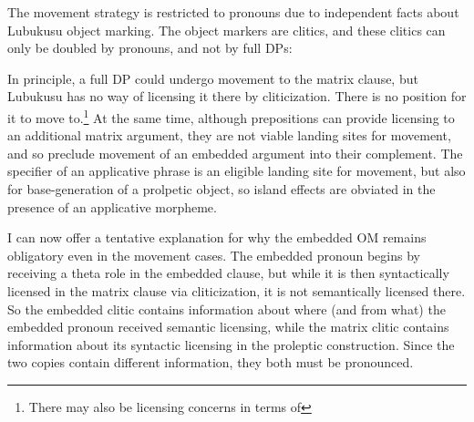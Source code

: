 \documentclass[output=paper,colorlinks,citecolor=brown]{langscibook}
\begin{document}
The movement strategy is restricted to pronouns due to independent facts about Lubukusu object marking. The object markers are clitics, and these clitics can only be doubled by pronouns, and not by full DPs:

\z

\z

\z

In principle, a full DP could undergo movement to the matrix clause, but Lubukusu has no way of licensing it there by cliticization. There is no position for it to move to.\footnote{There may also be licensing concerns in terms of } At the same time, although prepositions can provide licensing to an additional matrix argument, they are not viable landing sites for movement, and so preclude movement of an embedded argument into their complement. The specifier of an applicative phrase is an eligible landing site for movement, but also for base-generation of a prolpetic object, so island effects are obviated in the presence of an applicative morpheme.

I can now offer a tentative explanation for why the embedded OM remains obligatory even in the movement cases. The embedded pronoun begins by receiving a theta role in the embedded clause, but while it is then syntactically licensed in the matrix clause via cliticization, it is not semantically licensed there. So the embedded clitic contains information about where (and from what) the embedded pronoun received semantic licensing, while the matrix clitic contains information about its syntactic licensing in the proleptic construction. Since the two copies contain different information, they both must be pronounced.
\end{document}
